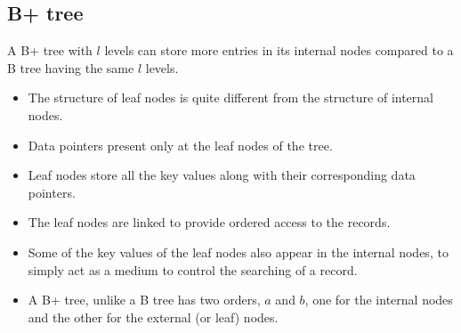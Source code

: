\documentclass[10pt, a4paper]{extarticle}
\theoremstyle{definition}
\begin{document}
	\subsection{B+ tree}
	A B+ tree with $l$ levels can store more entries in its internal nodes compared to a B tree having the same $l$ levels.


	\begin{itemize}
		\item The structure of leaf nodes is quite different from the structure of internal nodes.
		\item Data pointers present only at the leaf nodes of the tree.
		\item Leaf nodes store all the key values along with their corresponding data pointers.
		\item The leaf nodes are linked to provide ordered access to the records.
		\item Some of the key values of the leaf nodes also appear in the internal nodes, to simply act as a medium to control the searching of a record.
		\item A B+ tree, unlike a B tree has two orders, $a$ and $b$, one for the internal nodes and the other for the external (or leaf) nodes.
	\end{itemize}
\end{document}
